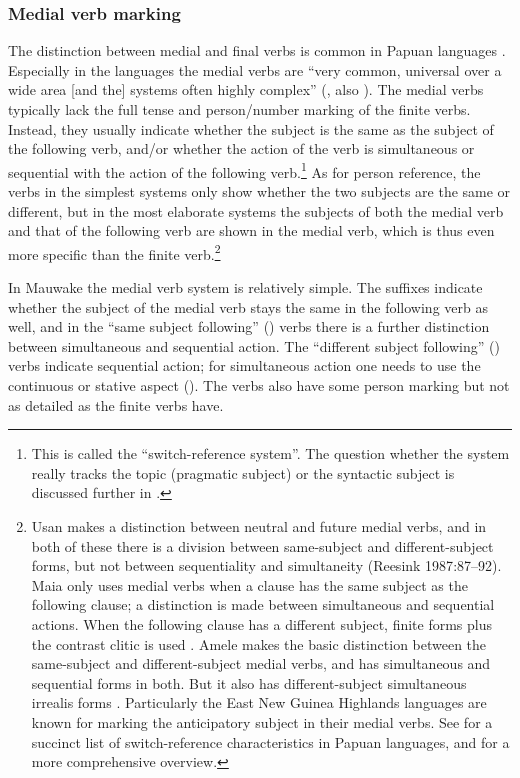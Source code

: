\subsubsection{Medial verb marking}\label{sec:3.8.3.5}
{}
The distinction between medial and final verbs is common in Papuan languages \citep[11]{Foley1986}. Especially in the  languages the medial verbs are ``{very common, universal over a wide area [and the] systems often highly complex}'' (\citealt[63]{Wurm1982}, also \citealt{Roberts1997}). The medial verbs typically lack the full tense and person/number marking of the finite verbs. Instead, they usually indicate whether the subject is the same as the subject of the following verb, and/or whether the action of the verb is simultaneous or sequential with the action of the following verb.\footnote{This is called the ``switch-reference system''. {The question whether} the system really tracks the topic (pragmatic subject) or the syntactic subject is discussed further in .} As for person reference, the verbs in the simplest systems only show whether the two subjects are the same or different, but in the most elaborate systems the subjects of both the medial verb and that of the following verb are shown in the medial verb, which is thus even more specific than the finite verb.\footnote{Usan makes a distinction between neutral and future medial verbs, and in both of these there is a division between same-subject and different-subject forms, but not between sequentiality and simultaneity {(Reesink 1987}:87--92). Maia only uses medial verbs when a clause has the same subject as the following clause; a distinction is made between simultaneous and sequential actions. When the following clause has a different subject, finite forms plus the contrast clitic \textstyleFootnoteBaseChar{\nobreakdash-(} is used \citep[87]{Hardin2002}. Amele makes the basic distinction between the same-subject and different-subject medial verbs, and has simultaneous and sequential forms in both. But it also has different-subject simultaneous irrealis forms \citep[275]{Roberts1987}. Particularly the East New Guinea Highlands languages are known for marking the anticipatory subject in their medial verbs. See \citet[40--41]{Franklin1983} for a succinct list of switch-reference characteristics in Papuan languages, and \citet{Roberts1997} for a more comprehensive overview.} 

In Mauwake the medial verb system is relatively simple. The suffixes indicate whether the subject of the medial verb stays the same in the following verb as well, and in the ``same subject following'' () verbs there is a further distinction between simultaneous and sequential action. The ``different subject following'' () verbs indicate sequential action; for simultaneous action one needs to use the continuous or stative aspect (). The  verbs also have some person marking but not as detailed as the finite verbs have.

